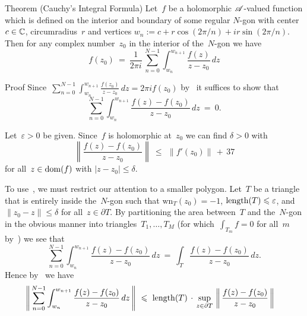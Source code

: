 \documentclass[a]{subfiles}
\begin{document}
\begin{parsec}%
\begin{point}{Theorem (Cauchy's Integral Formula)}%
%
Let~$f$ be a holomorphic $\mathscr{A}$-valued function
which is defined on the interior and boundary
of some regular $N$-gon 
with center~$c\in\mathbb{C}$,
circumradius~$r$
and vertices $w_n := c+r\cos(2\pi/n)+ir\sin(2\pi/n)$.
Then for any complex number~$z_0$ in
the interior of the~$N$-gon
we have
\begin{equation*}
	f(z_0)\ = \ \frac{1}{2\pi i}\,\sum_{n=0}^{N-1}\int_{w_n}^{w_{n+1}}
	\frac{f(z)}{z-z_0}\,dz
\end{equation*}
\begin{point}{Proof}%
	Since~$\sum_{n=0}^{N-1} \int_{w_n}^{w_{n+1}} \frac{f(z_0)}{z-z_0}\,dz
	= 2\pi i f(z_0)$ by~
it suffices to show that
\begin{equation}
\label{eq:cauchy-formula-1}
\sum_{n=0}^{N-1}\int_{w_n}^{w_{n+1}} \frac{f(z)-f(z_0)}{z-z_0}\,dz \ = \ 0.
\end{equation}
\begin{point}%
Let~$\varepsilon>0$ be given.
Since~$f$ is holomorphic at~$z_0$
we can find $\delta>0$ with
\begin{equation*}
\left\|\frac{f(z)-f(z_0)}{z-z_0}\right\|
\ \leq \ \,\|f'(z_0)\|\,+\,37
\end{equation*}
for all~$z\in\operatorname{dom}(f)$ with $\left|z-z_0\right|\leq \delta$. 
\end{point}
\begin{point}%
To use~,
we must restrict our attention to a smaller polygon.
Let~$T$ be a triangle 
that is entirely inside the~$N$-gon
such that  $\mathrm{wn}_T(z_0)=-1$,
$\operatorname{length}(T)\leqslant \varepsilon$,
and $\|z_0-z\|\leq \delta$ for all~$z\in \partial T$.
By partitioning the area
between~$T$ and the~$N$-gon
in the obvious manner
into triangles~$T_1,\dotsc,T_M$
(for which~$\int_{T_m}f=0$ for all~$m$ by~)
we see that
\begin{equation}
\label{eq:cauchy-formula-2}
\sum_{n=0}^{N-1}\int_{w_n}^{w_{n+1}} \frac{f(z)-f(z_0)}{z-z_0}\,dz
\ = \ 
\int_T \frac{f(z)-f(z_0)}{z-z_0}\,dz.
\end{equation}
Hence by~
we have
\begin{alignat*}{3}
	\left\|\,\sum_{n=0}^{N-1} 
	\int_{w_n}^{w_{n+1}} \frac{f(z)-f(z_0)}{z-z_0}\,dz\,\right\|
	\ &\leq \ \length(T)\,\cdot\,
\sup_{z\in\partial T} \,\left\|\,\frac{f(z)-f(z_0)}{z-z_0}\,\right\|

\end{alignat*}
\end{point}
\end{point}
\end{point}
\end{parsec}
\end{document}
